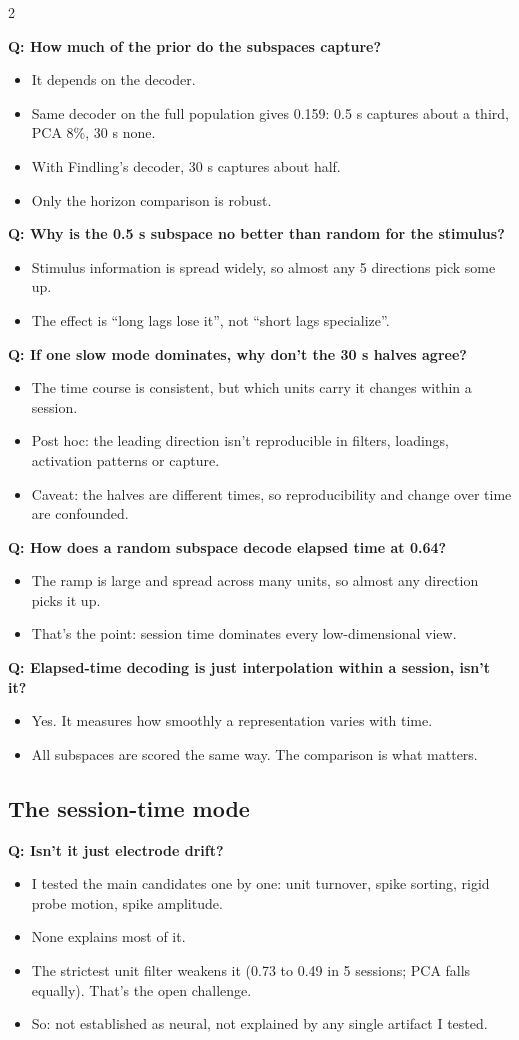 \documentclass[10pt]{article}
\newcommand{\q}[2]{\par\smallskip\noindent\begin{minipage}{\linewidth}\raggedright{\bfseries\color{teal}Q: #1}\par\vspace{1pt}\begin{itemize}#2\end{itemize}\end{minipage}\par}
\begin{document}
\begin{multicols}{2}
\q{How much of the prior do the subspaces capture?}{
\item It depends on the decoder.
\item Same decoder on the full population gives 0.159: 0.5 s captures about a third, PCA 8\%, 30 s none.
\item With Findling's decoder, 30 s captures about half.
\item Only the horizon comparison is robust.}

\q{Why is the 0.5 s subspace no better than random for the stimulus?}{
\item Stimulus information is spread widely, so almost any 5 directions pick some up.
\item The effect is ``long lags lose it'', not ``short lags specialize''.}

\q{If one slow mode dominates, why don't the 30 s halves agree?}{
\item The time course is consistent, but which units carry it changes within a session.
\item Post hoc: the leading direction isn't reproducible in filters, loadings, activation patterns or capture.
\item Caveat: the halves are different times, so reproducibility and change over time are confounded.}

\q{How does a random subspace decode elapsed time at 0.64?}{
\item The ramp is large and spread across many units, so almost any direction picks it up.
\item That's the point: session time dominates every low-dimensional view.}

\q{Elapsed-time decoding is just interpolation within a session, isn't it?}{
\item Yes. It measures how smoothly a representation varies with time.
\item All subspaces are scored the same way. The comparison is what matters.}

\subsection*{The session-time mode}

\q{Isn't it just electrode drift?}{
\item I tested the main candidates one by one: unit turnover, spike sorting, rigid probe motion, spike amplitude.
\item None explains most of it.
\item The strictest unit filter weakens it (0.73 to 0.49 in 5 sessions; PCA falls equally). That's the open
challenge.
\item So: not established as neural, not explained by any single artifact I tested.}


\end{multicols}
\end{document}
